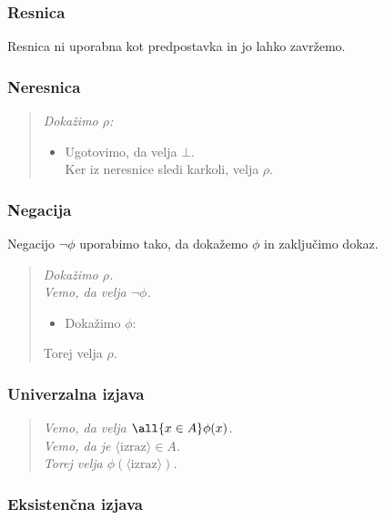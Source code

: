\subsubsection{Resnica}

Resnica ni uporabna kot predpostavka in jo lahko zavržemo.

\subsubsection{Neresnica}

\begin{quote}
  \sl
  Dokažimo $\rho$:
  \begin{itemize}
  \item[]
    Ugotovimo, da velja $\bot$.\\
    Ker iz neresnice sledi karkoli, velja $\rho$.
  \end{itemize}
\end{quote}


\subsubsection{Negacija}

Negacijo $\lnot \phi$ uporabimo tako, da dokažemo $\phi$ in zaključimo dokaz.
%
\begin{quote}
  \sl
  Dokažimo $\rho$.\\
  Vemo, da velja $\lnot\phi$.
  \begin{itemize}
  \item Dokažimo $\phi$: \quad {}
  \end{itemize}
  Torej velja $\rho$.
\end{quote}

\subsubsection{Univerzalna izjava}

\begin{quote}
  \sl
  Vemo, da velja $\all{x \in A} \phi(x)$.\\
  Vemo, da je $\langle\text{izraz}\rangle \in A$.\\
  Torej velja $\phi(\langle\text{izraz}\rangle)$.
\end{quote}

\subsubsection{Eksistenčna izjava}

